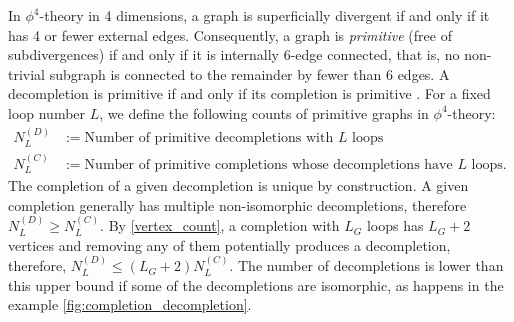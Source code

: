\documentclass[12pt,a4paper]{article}
\renewcommand{\|}{\rule[-0.4ex]{0.2ex}{1.2em}}
\begin{document}
In $\phi^4$-theory in 4 dimensions, a graph is superficially divergent if and only if it has 4 or fewer external edges. Consequently, a graph is \emph{primitive} (free of subdivergences) if and only if it is internally 6-edge connected, that is, no non-trivial subgraph is connected to the remainder by fewer than 6 edges.
A decompletion is primitive if and only if its completion is primitive \cite{schnetz_quantum_2010}.
For a fixed loop number $L$, we define the following counts of primitive graphs in $\phi^4$-theory:
\begin{align}\label{def:NL}
	N^{(D)}_L &:= \text{Number of primitive decompletions with $L$ loops}\\
	N^{(C)}_L &:= \text{Number of primitive  completions whose decompletions have $L$ loops}.\nonumber
\end{align}
The completion of a given decompletion is unique by construction. A given completion generally has multiple non-isomorphic decompletions, therefore $N^{(D)}_L \geq N^{(C)}_L$. By \cref{vertex_count}, a completion with $L_G$ loops  has $L_G+2$ vertices and removing any of them potentially produces a decompletion, therefore, $N^{(D)}_L \leq (L_G+2)N^{(C)}_L$. The number of decompletions is lower than this upper bound  if some of the decompletions are isomorphic, as happens in the example \cref{fig:completion_decompletion}.
\end{document}
